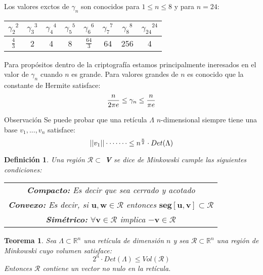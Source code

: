 \documentclass[12pt]{report}
\newtheorem{defi}{Definición}
\newtheorem{teo}{Teorema}
\begin{document}
Los valores exctos de $\gamma_{n}$ son conocidos para $1 \leq n \leq 8$ y para $n=24$:
\begin{table}[h]
	    \centering
	        \begin{tabular}{| c | c | c | c | c | c | c | c |}
			        \hline 
				${\gamma_{2}}^{2}$ & ${\gamma_{3}}^{3}$ & ${\gamma_{4}}^{4}$ & ${\gamma_{5}}^{5}$ & ${\gamma_{6}}^{6}$ & ${\gamma_{7}}^{7}$ & ${\gamma_{8}}^{8}$ & ${\gamma_{24}}^{24}$ \\
				\hline
				$\frac{4}{3}$ & 2 & 4 & 8 & $\frac{64}{3}$ & 64 & 256 & 4 \\
				\hline
				    \end{tabular}
\end{table}

Para propósitos dentro de la criptografía estamos principalmente ineresados en el valor de $\gamma_{n}$ cuando $n$ es grande. Para valores grandes de $n$ es conocido que la constante de Hermite satisface:
\begin{equation}
	\centering
	\frac{n}{2\pi e} \leq \gamma_{n} \leq \frac{n}{\pi e}
\end{equation}
\begin{block}{Observación}
	Se puede probar que una retícula $\Lambda$ $n$-dimensional siempre tiene una base ${v}_{1},...,{v}_{n}$ satisface: 
	\begin{equation}
		\centering
		||{v}_{1}|| \cdot \cdots \cdots \leq n^{\frac{n}{2}}\cdot Det(\Lambda)
	\end{equation}
\end{block}

\begin{defi}
Una región $\mathcal{R} \subset$ \textbf{V} se dice de Minkowski cumple las siguientes condiciones:
\begin{table}[h]
\centering
\begin{tabular}{| c |}
\hline
\textbf{Compacto:} Es decir que sea cerrado y acotado\\
\textbf{Convexo:} Es decir, si $\mathbf{u,w}\in \mathcal{R}$ entonces  $\mathbf{seg[u,v]} \subset \mathcal{R}$\\
\textbf{Simétrico:} $\forall \mathbf{v} \in \mathcal{R}$ implica $\mathbf{-v} \in \mathcal{R}$\\
\hline
\end{tabular}
\end{table}
\end{defi}

\begin{teo}
Sea $\Lambda \subset \mathbb{R}^{n}$ una retícula de dimensión $n$ y sea $\mathcal{R} \subset \mathbb{R}^{n}$ una región de Minkowski cuyo volumen satisface:
\[ 2^{n}\cdot Det(\Lambda) \leq Vol(\mathcal{R}) \]
Entonces $\mathcal{R}$ contiene un vector no nulo en la retícula.
\end{teo}
\end{document}
